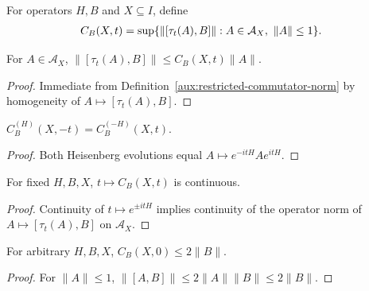 \begin{definition}
    \label{aux:restricted-commutator-norm}
    \leanok
    For operators $H,B$ and $X\subseteq I$, define
    \begin{align}
        C_B(X,t) & =\sup\{\|[\tau_t(A),B]\|: A\in\mathcal A_X,\ \|A\|\leq1\}.\notag
    \end{align}
\end{definition}

\begin{lemma}
    \label{aux:restricted-commutator-evaluation}
    \leanok
    For $A\in\mathcal A_X$, $\|[\tau_t(A),B]\|\leq C_B(X,t)\|A\|$.
\end{lemma}
\begin{proof}\leanok
    Immediate from Definition~\ref{aux:restricted-commutator-norm} by homogeneity of $A\mapsto[\tau_t(A),B]$.
\end{proof}

\begin{lemma}
    \label{aux:restricted-commutator-negative-time}
    \leanok
    $C_B^{(H)}(X,-t)=C_B^{(-H)}(X,t)$.
\end{lemma}
\begin{proof}\leanok
    Both Heisenberg evolutions equal $A\mapsto e^{-itH}Ae^{itH}$.
\end{proof}

\begin{lemma}
    \label{aux:restricted-commutator-continuity}
    \leanok
    For fixed $H,B,X$, $t\mapsto C_B(X,t)$ is continuous.
\end{lemma}
\begin{proof}\leanok
    Continuity of $t\mapsto e^{\pm itH}$ implies continuity of the operator norm of $A\mapsto[\tau_t(A),B]$ on $\mathcal A_X$.
\end{proof}

\begin{lemma}
    \label{aux:restricted-initial-commutator-bound}
    \leanok
    For arbitrary $H,B,X$, $C_B(X,0)\leq2\|B\|$.
\end{lemma}
\begin{proof}\leanok
    For $\|A\|\le1$, $\|[A,B]\|\le2\|A\|\|B\|\le2\|B\|$.
\end{proof}

